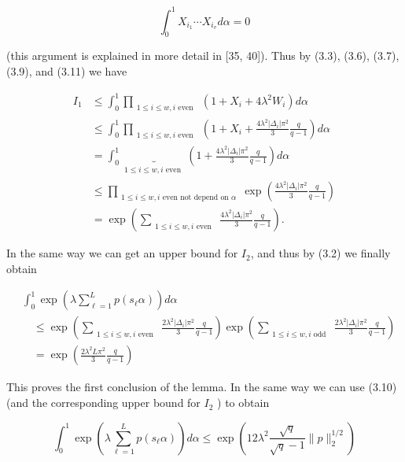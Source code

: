 \documentclass[10pt]{article}
\begin{document}
\begin{equation*}
\int_{0}^{1} X_{i_{1}} \cdots X_{i_{v}} d \alpha=0 \tag{3.11}
\end{equation*}


(this argument is explained in more detail in [35, 40]). Thus by (3.3), (3.6), (3.7), (3.9), and (3.11) we have

$$
\begin{aligned}
I_{1} & \leqslant \int_{0}^{1} \prod_{\substack{1 \leqslant i \leqslant w, i \text { even }}}\left(1+X_{i}+4 \lambda^{2} W_{i}\right) d \alpha \\
& \leqslant \int_{0}^{1} \prod_{\substack{1 \leqslant i \leqslant w, i \text { even }}}\left(1+X_{i}+\frac{4 \lambda^{2}\left|\Delta_{i}\right| \pi^{2}}{3} \frac{q}{q-1}\right) d \alpha \\
& =\int_{0}^{1} \underbrace{}_{\substack{1 \leqslant i \leqslant w, i \text { even }}}\left(1+\frac{4 \lambda^{2}\left|\Delta_{i}\right| \pi^{2}}{3} \frac{q}{q-1}\right) d \alpha \\
& \leqslant \prod_{\substack{1 \leqslant i \leqslant w, i \text { even not depend on } \alpha}} \exp \left(\frac{4 \lambda^{2}\left|\Delta_{i}\right| \pi^{2}}{3} \frac{q}{q-1}\right) \\
& =\exp \left(\sum_{\substack{1 \leqslant i \leqslant w, i \text { even }}} \frac{4 \lambda^{2}\left|\Delta_{i}\right| \pi^{2}}{3} \frac{q}{q-1}\right) .
\end{aligned}
$$

In the same way we can get an upper bound for $I_{2}$, and thus by (3.2) we finally obtain

$$
\begin{aligned}
& \int_{0}^{1} \exp \left(\lambda \sum_{\ell=1}^{L} p\left(s_{\ell} \alpha\right)\right) d \alpha \\
& \quad \leqslant \exp \left(\sum_{\substack{1 \leqslant i \leqslant w, i \text { even }}} \frac{2 \lambda^{2}\left|\Delta_{i}\right| \pi^{2}}{3} \frac{q}{q-1}\right) \exp \left(\sum_{\substack{1 \leqslant i \leqslant w, i \text { odd }}} \frac{2 \lambda^{2}\left|\Delta_{i}\right| \pi^{2}}{3} \frac{q}{q-1}\right) \\
& \quad=\exp \left(\frac{2 \lambda^{2} L \pi^{2}}{3} \frac{q}{q-1}\right)
\end{aligned}
$$

This proves the first conclusion of the lemma. In the same way we can use (3.10) (and the corresponding upper bound for $I_{2}$ ) to obtain

$$
\int_{0}^{1} \exp \left(\lambda \sum_{\ell=1}^{L} p\left(s_{\ell} \alpha\right)\right) d \alpha \leqslant \exp \left(12 \lambda^{2} \frac{\sqrt{q}}{\sqrt{q}-1}\|p\|_{2}^{1 / 2}\right)
$$
\end{document}
